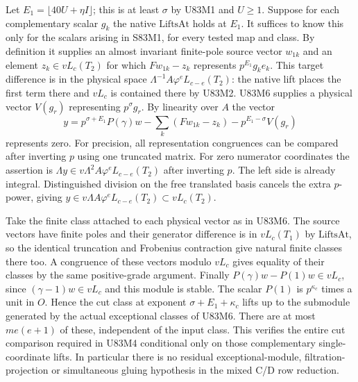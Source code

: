 Let $E_1=\lfloor40U+\eta I\rfloor$; this is at least $\sigma$
by U83M1 and $U\ge1$. Suppose for each complementary scalar
$g_k$ the native $\mathrm{LiftsAt}$ holds at $E_1$. It suffices
to know this only for the scalars arising in S83M1, for every
tested map and class. By definition it supplies an almost
invariant finite-pole source vector $w_{1k}$ and an element
$z_k\in vL_c(T_2)$ for which $F w_{1k}-z_k$ represents
$p^{E_1}g_k e_k$. This target difference is in the physical
space $\Lambda^{-1} A\varphi^e L_{c-e}(T_2)$: the native lift
places the first term there and $vL_c$ is contained there by
U83M2. U83M6 supplies a physical vector $V(g_r)$ representing
$p^\sigma g_r$. By linearity over $A$ the vector
\[
 y=p^{\sigma+E_1}P(\gamma)w-
        \sum_k(Fw_{1k}-z_k)-p^{E_1-\sigma}V(g_r)
\]
represents zero. For precision, all representation congruences
can be compared after inverting $p$ using one truncated matrix.
For zero numerator coordinates the assertion is
$\Lambda y\in v\Lambda^2 A\varphi^e L_{c-e}(T_2)$ after
inverting $p$. The left side is already integral. Distinguished
division on the free translated basis cancels the extra $p$-power,
giving $y\in v\Lambda A\varphi^e L_{c-e}(T_2)\subset vL_c(T_2)$.

Take the finite class attached to each physical vector as in
U83M6. The source vectors have finite poles and their generator
difference is in $vL_c(T_1)$ by $\mathrm{LiftsAt}$, so the
identical truncation and Frobenius contraction give natural
finite classes there too. A congruence of these vectors modulo
$vL_c$ gives equality of their classes by the same positive-grade
argument. Finally $P(\gamma)w-P(1)w\in vL_c$, since
$(\gamma-1)w\in vL_c$ and this module is stable. The scalar
$P(1)$ is $p^{\kappa_c}$ times a unit in $O$. Hence the cut
class at exponent $\sigma+E_1+\kappa_c$ lifts up to the
submodule generated by the actual exceptional classes of U83M6.
There are at most $me(e+1)$ of these, independent of the input
class. This verifies the entire cut comparison required in
U83M4 conditional only on those complementary single-coordinate
lifts. In particular there is no residual exceptional-module,
filtration-projection or simultaneous gluing hypothesis in the
mixed C/D row reduction.
